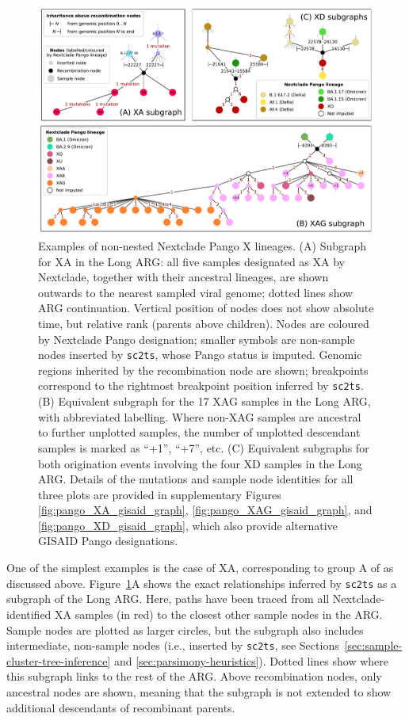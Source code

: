 \documentclass{article}
\begin{document}
\begin{figure}
\centering
\includegraphics[width=\textwidth]{figures/Pango_XA_XAG_XD_nxcld_tight_graph.pdf}
\caption{\label{fig:pango-simple-origin-graph} Examples of non-nested
Nextclade Pango X lineages. (A) Subgraph for XA in the Long ARG: all five samples designated
as XA by Nextclade, together with their ancestral lineages, are shown outwards to the nearest
sampled viral genome; dotted lines show ARG continuation. Vertical position of nodes does not
show absolute time, but relative rank (parents above children). Nodes are coloured by Nextclade
Pango designation; smaller symbols are non-sample nodes inserted by \texttt{sc2ts}, whose
Pango status is imputed. Genomic regions inherited by the recombination node are shown;
breakpoints correspond to the rightmost breakpoint position inferred by \texttt{sc2ts}.
(B) Equivalent subgraph for the 17 XAG samples in the Long ARG, with abbreviated labelling. Where
non-XAG samples are ancestral to further unplotted samples, the number of unplotted descendant samples
is marked as ``+1'', ``+7'', etc.
(C) Equivalent subgraphs for both origination events involving the four XD samples in the Long ARG.
Details of the mutations and sample node identities for all three plots are provided in
supplementary Figures \ref{fig:pango_XA_gisaid_graph}, \ref{fig:pango_XAG_gisaid_graph}, and \ref{fig:pango_XD_gisaid_graph}, which also provide alternative GISAID Pango designations.
} \end{figure}

One of the simplest examples is the case of XA, corresponding to group A
of \citet{Jackson2021-ik} as discussed above. Figure~\ref{fig:pango-simple-origin-graph}A
shows the exact relationships inferred by \texttt{sc2ts} as a subgraph of the Long ARG.
Here, paths have been traced from all
Nextclade-identified XA samples (in red) to the closest other sample nodes in the ARG.
Sample nodes are plotted as larger circles, but the subgraph also includes intermediate,
non-sample nodes (i.e., inserted by \texttt{sc2ts}, see Sections~\ref{sec:sample-cluster-tree-inference} and \ref{sec:parsimony-heuristics}). Dotted lines show where this subgraph links
to the rest of the ARG. Above recombination nodes, only ancestral nodes are shown, meaning
that the subgraph is not extended to show additional descendants of recombinant parents.
\end{document}
